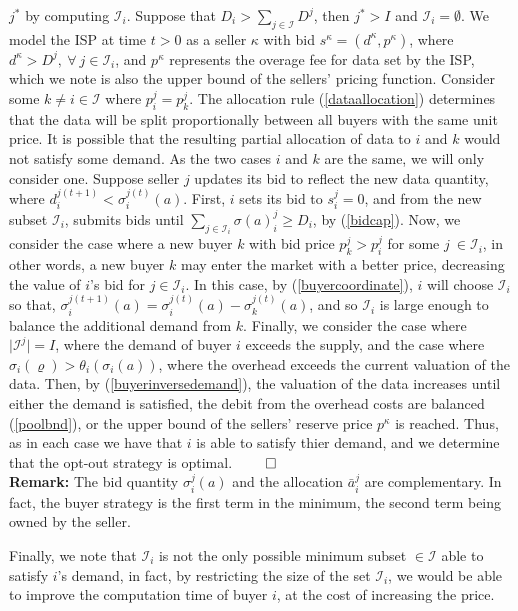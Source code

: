 \documentclass[sigconf, anonymous]{acmart}
\newcommand{\mcI}{\mathcal{I}}
\newcommand{\g}{\sigma}
\theoremstyle{definition}
\begin{document}
$j^*$ by computing $\mcI_i$.
Suppose that $D_i >
\sum_{j\in\mcI}D^j$, then $j^* > I$ and $\mcI_i = \emptyset$. 
We model the ISP at time $t>0$ as a seller $\kappa$ with bid $s^\kappa
=(d^\kappa, p^\kappa)$,
where $d^\kappa > D^j, \
\forall \ j\in\mcI_i$, and
$p^\kappa$ represents the overage fee for data set by the ISP, which we note is also the upper bound of the sellers'
pricing function.
Consider some $k \ne i \in \mcI$ where $p_i^j = p_k^j$. 
The allocation rule (\ref{dataallocation}) determines that the data will be
split proportionally
between all buyers with the same unit price. 
It is possible that the resulting partial allocation of data to $i$ and $k$
would not satisfy some demand. As the two cases $i$ and $k$ are the same, we
will only consider one. Suppose seller $j$ updates its
bid to reflect the new data quantity, where
$d_i^{j(t+1)} < \g_i^{j(t)}(a)$. First, $i$ sets its bid to $s_i^j = 0$, and
from the new subset $\mcI_i$, submits bids until
$\sum_{j\in\mcI_i} \g(a)_i^j \ge D_i$, by (\ref{bidcap}).
Now, we consider the case where a new buyer $k$ with bid
price $p_k^j > p_i^j$ for some $j \ \in \mcI_i$, in other
words, a new buyer $k$ may enter the market with a better price, decreasing the
value of $i$'s bid for $j\in\mcI_i$. In this case, by (\ref{buyercoordinate}),
$i$ will choose $\mcI_i$ so that, $\g_i^{j(t+1)}(a) = \g_i^{j(t)}(a) - \g_k^{j(t)}(a)$,
and so $\mcI_i$ is large enough to balance the additional demand from
$k$. Finally, we consider the case where $\vert\mcI^j\vert = I$, where the
demand of buyer $i$ exceeds the supply, and the case where $\g_i(\varrho) >
\theta_i(\g_i(a))$, where the overhead exceeds the current valuation of the
data. Then, by (\ref{buyerinversedemand}), the valuation of the data increases until either
the demand is satisfied, the debit from the overhead costs are balanced
(\ref{poolbnd}), or the upper bound of the sellers' reserve price
$p^\kappa$ is reached. Thus, as in each case we have that $i$ is able to satisfy thier demand,
and we determine that the opt-out strategy is optimal.
$\qed$\\
\textbf{Remark:} The bid quantity $\g_i^j(a)$ and the allocation $\bar{a}_i^j$
are complementary. In fact, the buyer strategy is the first term in the
minimum, the second term being owned by the seller.

Finally, we note that $\mcI_i$ is not the only
possible minimum subset $\in\mcI$ able to satisfy $i$'s demand, in fact, by
restricting the size of the set $\mcI_i$, we would be able to improve the
computation time of buyer $i$, at the cost of increasing the price.
\end{document}
